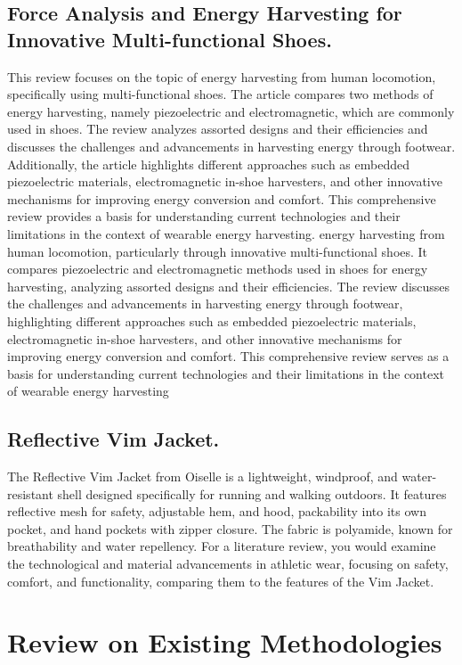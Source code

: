 \documentclass[11pt]{report}	%
\begin{document}
\subsection{Force Analysis and Energy Harvesting for Innovative Multi-functional Shoes.}
This review focuses on the topic of energy harvesting from human locomotion, specifically using multi-functional shoes. The article compares two methods of energy harvesting, namely piezoelectric and electromagnetic, which are commonly used in shoes. The review analyzes assorted designs and their efficiencies and discusses the challenges and advancements in harvesting energy through footwear. Additionally, the article highlights different approaches such as embedded piezoelectric materials, electromagnetic in-shoe harvesters, and other innovative mechanisms for improving energy conversion and comfort. This comprehensive review provides a basis for understanding current technologies and their limitations in the context of wearable energy harvesting. energy harvesting from human locomotion, particularly through innovative multi-functional shoes. It compares piezoelectric and electromagnetic methods used in shoes for energy harvesting, analyzing assorted designs and their efficiencies. The review discusses the challenges and advancements in harvesting energy through footwear, highlighting different approaches such as embedded piezoelectric materials, electromagnetic in-shoe harvesters, and other innovative mechanisms for improving energy conversion and comfort. This comprehensive review serves as a basis for understanding current technologies and their limitations in the context of wearable energy harvesting

\subsection{Reflective Vim Jacket.}
The Reflective Vim Jacket from Oiselle is a lightweight, windproof, and water-resistant shell designed specifically for running and walking outdoors. It features reflective mesh for safety, adjustable hem, and hood, packability into its own pocket, and hand pockets with zipper closure. The fabric is polyamide, known for breathability and water repellency. For a literature review, you would examine the technological and material advancements in athletic wear, focusing on safety, comfort, and functionality, comparing them to the features of the Vim Jacket.

\section{Review on Existing Methodologies }
\end{document}
